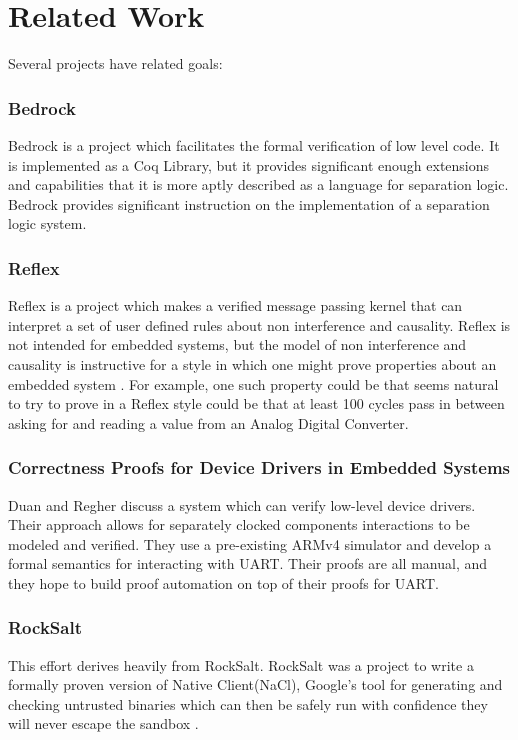 \documentclass[preprint,11pt]{sigplanconf}
\begin{document}
\section{Related Work}
Several projects have related goals:

\subsubsection{Bedrock}
Bedrock is a project which facilitates the formal verification of low
level code. It is implemented as a Coq Library, but it provides
significant enough extensions and capabilities that it is more aptly
described as a language for separation logic. Bedrock provides significant
instruction on the implementation of a separation logic system\cite{bedrock1}\cite{bedrock2}.
\subsubsection{Reflex}
Reflex is a project which makes a verified message passing kernel that
can interpret a set of user defined rules about non interference and
causality. Reflex is not intended for embedded systems, but the model
of non interference and causality is instructive for a style in which
one might prove properties about an embedded system \cite{reflex}. For example, one
such property could be that seems natural to try to prove in a Reflex
style could be that at least 100 cycles pass in between asking for and
reading a value from an Analog Digital Converter.
\subsubsection{Correctness Proofs for Device Drivers in Embedded Systems}
Duan and Regher\cite{drivers} discuss a system which can verify low-level device drivers.
Their approach allows for separately clocked components interactions to be modeled and verified.
They use a pre-existing ARMv4 simulator and develop a formal semantics for interacting with UART. Their proofs are all manual,
and they hope to build proof automation on top of their proofs for UART.
\subsubsection{RockSalt}
This effort derives heavily from RockSalt. RockSalt was a project to
write a formally proven version of Native Client(NaCl), Google's tool
for generating and checking untrusted binaries which can then be
safely run with confidence they will never escape the sandbox
\cite{rocksalt}.
\end{document}
